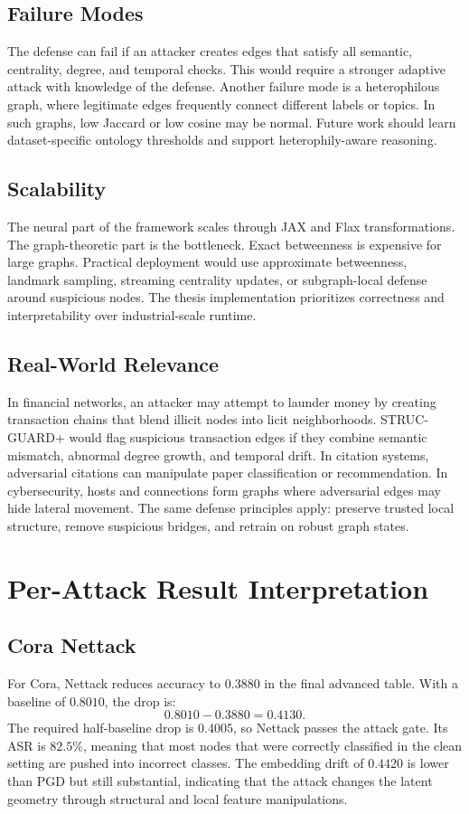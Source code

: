 \documentclass[12pt,oneside]{report}
\begin{document}
\section{Failure Modes}
The defense can fail if an attacker creates edges that satisfy all semantic, centrality, degree, and temporal checks. This would require a stronger adaptive attack with knowledge of the defense. Another failure mode is a heterophilous graph, where legitimate edges frequently connect different labels or topics. In such graphs, low Jaccard or low cosine may be normal. Future work should learn dataset-specific ontology thresholds and support heterophily-aware reasoning.

\section{Scalability}
The neural part of the framework scales through JAX and Flax transformations. The graph-theoretic part is the bottleneck. Exact betweenness is expensive for large graphs. Practical deployment would use approximate betweenness, landmark sampling, streaming centrality updates, or subgraph-local defense around suspicious nodes. The thesis implementation prioritizes correctness and interpretability over industrial-scale runtime.

\section{Real-World Relevance}
In financial networks, an attacker may attempt to launder money by creating transaction chains that blend illicit nodes into licit neighborhoods. STRUC-GUARD+ would flag suspicious transaction edges if they combine semantic mismatch, abnormal degree growth, and temporal drift. In citation systems, adversarial citations can manipulate paper classification or recommendation. In cybersecurity, hosts and connections form graphs where adversarial edges may hide lateral movement. The same defense principles apply: preserve trusted local structure, remove suspicious bridges, and retrain on robust graph states.

\chapter{Per-Attack Result Interpretation}

\section{Cora Nettack}
For Cora, Nettack reduces accuracy to $0.3880$ in the final advanced table. With a baseline of $0.8010$, the drop is:
$$
0.8010-0.3880=0.4130.
$$
The required half-baseline drop is $0.4005$, so Nettack passes the attack gate. Its ASR is $82.5\%$, meaning that most nodes that were correctly classified in the clean setting are pushed into incorrect classes. The embedding drift of $0.4420$ is lower than PGD but still substantial, indicating that the attack changes the latent geometry through structural and local feature manipulations.
\end{document}
